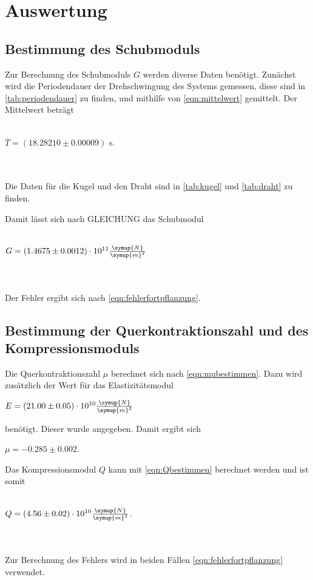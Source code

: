 \section{Auswertung}
\label{sec:Auswertung}
\subsection{Bestimmung des Schubmoduls}



Zur Berechnung des Schubmoduls $G$ werden diverse Daten benötigt. Zunächst wird die Periodendauer der Drehschwingung des Systems gemessen, diese sind in \autoref{tab:periodendauer} zu finden, und mithilfe von \eqref{eqn:mittelwert} gemittelt. Der Mittelwert beträgt
\\ \\
\centerline{$\overline{T} = (18.28210 \pm 0.00009)$ s.}
\\ \\
Die Daten für die Kugel und den Draht sind in \autoref{tab:kugel} und \autoref{tab:draht} zu finden.




Damit lässt sich nach GLEICHUNG das Schubmodul
\\ \\
\centerline{$G = (1.4675 \pm 0.0012) \cdot 10^{11} \frac{\symup{N}}{\symup{m}^2}$}
\\ \\
Der Fehler ergibt sich nach \eqref{eqn:fehlerfortpflanzung}.

\subsection{Bestimmung der Querkontraktionszahl und des Kompressionsmoduls}

Die Querkontraktionszahl $\mu$ berechnet sich nach \eqref{eqn:mubestimmen}. Dazu wird zusätzlich der Wert für das Elastizitätsmodul 

\centerline{$E = (21.00 \pm 0.05) \cdot 10^{10} \frac{\symup{N}}{\symup{m}^2}$}
benötigt. Dieser wurde angegeben. Damit ergibt sich 

\centerline{$\mu = -0.285 \pm 0.002$.}
Das Kompressionsmodul $Q$ kann mit \eqref{eqn:Qbestimmen} berechnet werden und ist somit
\\ \\
\centerline{$Q = (4.56 \pm 0.02) \cdot 10^{10} \frac{\symup{N}}{\symup{m}^2}$.}
\\ \\
Zur Berechnung des Fehlers wird in beiden Fällen \eqref{eqn:fehlerfortpflanzung} verwendet.



